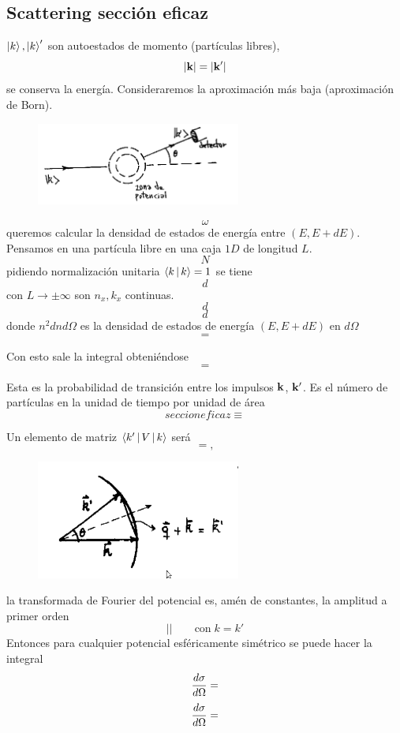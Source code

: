 \documentclass[10pt,oneside]{CBFT_book}
\begin{document}
\subsection{Scattering sección eficaz}

$\Ket{k},\Ket{k}'$ son autoestados de momento (partículas libres),
\[
	|\vb{k}| = |\vb{k}'| 
\]
se conserva la energía. Consideraremos la aproximación más baja (aproximación de Born).
\begin{figure}[htb]
	\begin{center}
	\includegraphics[width=0.6\textwidth]{images/teo2_28.pdf}
	\end{center}
	\caption{}
\end{figure} 

\[
	\omega 
\]
queremos calcular la densidad de estados de energía entre $(E,E+dE)$. Pensamos en una partícula libre en una 
caja $1D$ de longitud $L$.
\[
	N
\]
pidiendo normalización unitaria $\Braket{k|k}=1$ se tiene 
\[
	d
\]
con $L\to\pm\infty$ son $n_x,k_x$ continuas.
\[
	d
\]
\[
	d
\]
donde $n^2 dn d\Omega$ es la densidad de estados de energía $(E,E+dE)$ en $d\Omega$
\[
	=
\]

Con esto sale la integral obteniéndose
\[
	=
\]

Esta es la probabilidad de transición entre los impulsos $\vb{k}$, $\vb{k}'$. Es el número de partículas en 
la unidad de tiempo por unidad de área 
\[
	seccion eficaz \equiv 
\]

Un elemento de matriz $\Braket{k'|V|k}$ será 
\[
	=,
\]
\begin{figure}[htb]
	\begin{center}
	\includegraphics[width=0.6\textwidth]{images/teo2_31.pdf}
	\end{center}
	\caption{}
\end{figure} 
la transformada de Fourier del potencial es, amén de constantes, la amplitud a primer orden 
\[
	|| \qquad \text{con} \; k=k' 
\]
Entonces para cualquier potencial esféricamente simétrico se puede hacer la integral 
\[
	\frac{d^{\hspace{-0.05em}} {\sigma}}{d {\Omega}^{\hspace{-0.05em}}} =
\]
\[
	\frac{d^{\hspace{-0.05em}} {\sigma}}{d {\Omega}^{\hspace{-0.05em}}} =
\]
\end{document}
